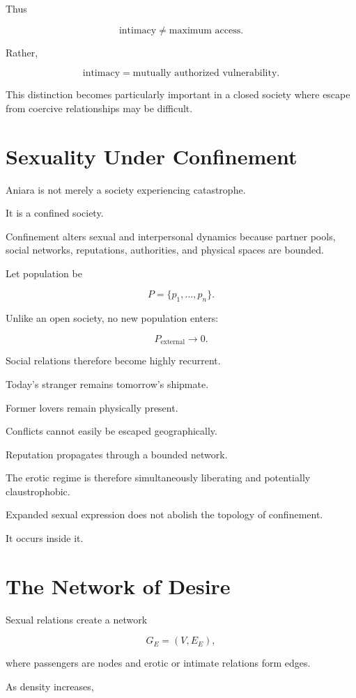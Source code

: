 \documentclass[11pt,oneside]{book}
\theoremstyle{definition}
\theoremstyle{remark}
\begin{document}
Thus

\[
\text{intimacy}
\neq
\text{maximum access}.
\]

Rather,

\[
\text{intimacy}
=
\text{mutually authorized vulnerability}.
\]

This distinction becomes particularly important in a closed society where escape from coercive relationships may be difficult.

\section{Sexuality Under Confinement}

Aniara is not merely a society experiencing catastrophe.

It is a confined society.

Confinement alters sexual and interpersonal dynamics because partner pools, social networks, reputations, authorities, and physical spaces are bounded.

Let population be

\[
P=\{p_1,\ldots,p_n\}.
\]

Unlike an open society, no new population enters:

\[
P_{\mathrm{external}}\rightarrow0.
\]

Social relations therefore become highly recurrent.

Today's stranger remains tomorrow's shipmate.

Former lovers remain physically present.

Conflicts cannot easily be escaped geographically.

Reputation propagates through a bounded network.

The erotic regime is therefore simultaneously liberating and potentially claustrophobic.

Expanded sexual expression does not abolish the topology of confinement.

It occurs inside it.

\section{The Network of Desire}

Sexual relations create a network

\[
G_E=(V,E_E),
\]

where passengers are nodes and erotic or intimate relations form edges.

As density increases,
\end{document}
